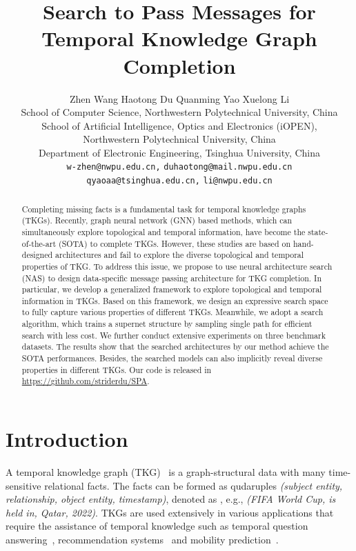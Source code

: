 \documentclass[11pt]{article}
\title{Search to Pass Messages for Temporal Knowledge Graph Completion}
\author{
Zhen Wang \quad  
Haotong Du\footnotemark[1] \quad 
Quanming Yao\footnotemark[1] \quad 
Xuelong Li \\
	School of Computer Science, Northwestern Polytechnical University, China \\
	School of Artificial Intelligence, Optics and Electronics (iOPEN), \\ Northwestern Polytechnical University, China \\
	Department of Electronic Engineering, Tsinghua University, China \\
	\texttt{w-zhen@nwpu.edu.cn,}
	\texttt{duhaotong@mail.nwpu.edu.cn}\\
	\texttt{qyaoaa@tsinghua.edu.cn,}
	\texttt{li@nwpu.edu.cn}}
\begin{document}
\begin{abstract}
	
Completing missing facts is a fundamental task for temporal knowledge graphs (TKGs).
Recently,
graph neural network (GNN) based methods, 
which can simultaneously explore topological and temporal information, 
have become the state-of-the-art (SOTA) to complete TKGs. 
However, 
these studies are based on hand-designed architectures and fail to explore the diverse topological and temporal properties of TKG.
To address this issue, 
we propose to use neural architecture search (NAS) to design data-specific message passing architecture for TKG completion.
In particular, 
we develop a generalized framework to explore topological and temporal information in TKGs.
Based on this framework, we design an expressive search space to fully capture various properties of different TKGs. 
Meanwhile,
we adopt a search algorithm, which trains a supernet structure by sampling single path for efficient search with less cost.
We further conduct extensive experiments on three benchmark datasets.
The results show that the searched architectures by our method achieve the SOTA performances.
Besides, 
the searched models can also implicitly reveal diverse properties in different TKGs.
Our code is released in \url{https://github.com/striderdu/SPA}. 

\end{abstract}

\section{Introduction}

A temporal knowledge graph (TKG)~\citep{cai2022temporal}
is a graph-structural data with many time-sensitive relational facts. 
The facts can be formed as qudaruples 
\textit{(subject entity, relationship, object entity, timestamp)}, 
denoted as , 
e.g., 
\emph{(FIFA World Cup, is held in, Qatar, 2022)}. 
TKGs are used extensively in various applications that 
require the assistance of temporal knowledge 
such as 
temporal question answering~\citep{saxena-etal-2021-question}, 
recommendation systems~\citep{zhao2021time} 
and mobility prediction~\citep{wang2021spatio}.
\end{document}
